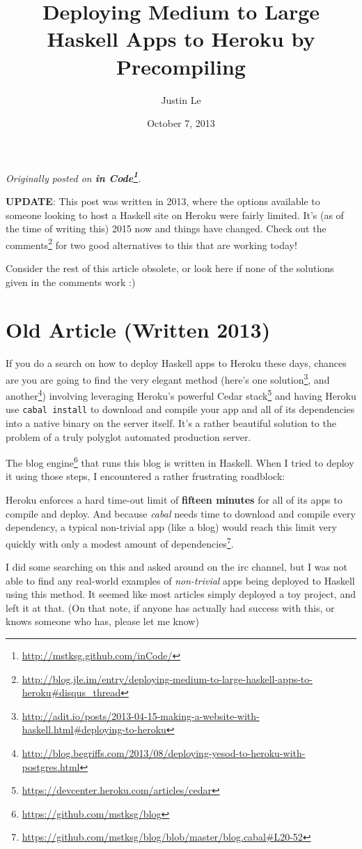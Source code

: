 \documentclass[]{article}
\title{Deploying Medium to Large Haskell Apps to Heroku by Precompiling}
\author{Justin Le}
\date{October 7, 2013}
\renewcommand{\href}[2]{#2\footnote{\url{#1}}}
\begin{document}
\maketitle

\emph{Originally posted on
\textbf{\href{http://mstksg.github.com/inCode/}{in Code}}.}

\textbf{UPDATE}: This post was written in 2013, where the options
available to someone looking to host a Haskell site on Heroku were
fairly limited. It's (as of the time of writing this) 2015 now and
things have changed. Check out
\href{http://blog.jle.im/entry/deploying-medium-to-large-haskell-apps-to-heroku\#disqus_thread}{the
comments} for two good alternatives to this that are working today!

Consider the rest of this article obsolete, or look here if none of the
solutions given in the comments work :)

\section{Old Article (Written 2013)}\label{old-article-written-2013}

If you do a search on how to deploy Haskell apps to Heroku these days,
chances are you are going to find the very elegant method (here's
\href{http://adit.io/posts/2013-04-15-making-a-website-with-haskell.html\#deploying-to-heroku}{one
solution}, and
\href{http://blog.begriffs.com/2013/08/deploying-yesod-to-heroku-with-postgres.html}{another})
involving leveraging Heroku's powerful
\href{https://devcenter.heroku.com/articles/cedar}{Cedar stack} and
having Heroku use \texttt{cabal\ install} to download and compile your
app and all of its dependencies into a native binary on the server
itself. It's a rather beautiful solution to the problem of a truly
polyglot automated production server.

The \href{https://github.com/mstksg/blog}{blog engine} that runs this
blog is written in Haskell. When I tried to deploy it using those steps,
I encountered a rather frustrating roadblock:

Heroku enforces a hard time-out limit of \textbf{fifteen minutes} for
all of its apps to compile and deploy. And because \emph{cabal} needs
time to download and compile every dependency, a typical non-trivial app
(like a blog) would reach this limit very quickly with only a
\href{https://github.com/mstksg/blog/blob/master/blog.cabal\#L20-52}{modest
amount of dependencies}.

I did some searching on this and asked around on the irc channel, but I
was not able to find any real-world examples of \emph{non-trivial} apps
being deployed to Haskell using this method. It seemed like most
articles simply deployed a toy project, and left it at that. (On that
note, if anyone has actually had success with this, or knows someone who
has, please let me know)
\end{document}
